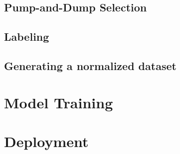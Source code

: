 \subsection{Pump-and-Dump Selection}

\subsection{Labeling}

\subsection{Generating a normalized dataset}

\section{Model Training}

\section{Deployment}

